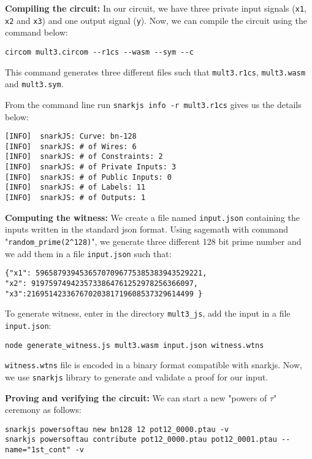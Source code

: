 \documentclass[a4paper,oneside,12pt]{book}
\begin{document}
\noindent \textbf{Compiling the circuit:} In our circuit, we have three private input signals (\verb|x1|, \verb|x2| and \verb|x3|) and one output signal (\verb|y|). Now, we can compile the circuit using the command below:

\begin{verbatim}
circom mult3.circom --r1cs --wasm --sym --c
\end{verbatim}

\noindent This command generates three different files such that \verb|mult3.r1cs|, \verb|mult3.wasm| and \verb|mult3.sym|.

\noindent From the command line run \verb|snarkjs info -r mult3.r1cs| gives us the details below:

\begin{verbatim}
[INFO]  snarkJS: Curve: bn-128
[INFO]  snarkJS: # of Wires: 6
[INFO]  snarkJS: # of Constraints: 2
[INFO]  snarkJS: # of Private Inputs: 3
[INFO]  snarkJS: # of Public Inputs: 0
[INFO]  snarkJS: # of Labels: 11
[INFO]  snarkJS: # of Outputs: 1
\end{verbatim}

\noindent \textbf{Computing the witness:} We create a file named \verb|input.json| containing the inputs written in the standard json format. Using sagemath with command "\verb|random_prime(2^128)|", we generate three different 128 bit prime number and we add them in a file \verb|input.json| such that:

\begin{verbatim}
{"x1": 59658793945365707096775385383943529221, 
"x2": 9197597494235733864761252978256366097,
"x3":21695142336767020381719608537329614499 }
\end{verbatim}

\noindent To generate witness, enter in the directory \verb|mult3_js|, add the input in a file \verb|input.json|:

\begin{verbatim}
node generate_witness.js mult3.wasm input.json witness.wtns
\end{verbatim}

\noindent \verb|witness.wtns| file is encoded in a binary format compatible with snarkjs. Now, we use \verb|snarkjs| library to generate and validate a proof for our input. 

\noindent \textbf{Proving and verifying the circuit:} We can start a new "powers of $\tau$" ceremony as follows:
\begin{verbatim}
snarkjs powersoftau new bn128 12 pot12_0000.ptau -v
snarkjs powersoftau contribute pot12_0000.ptau pot12_0001.ptau --name="1st_cont" -v
\end{verbatim}
\end{document}
